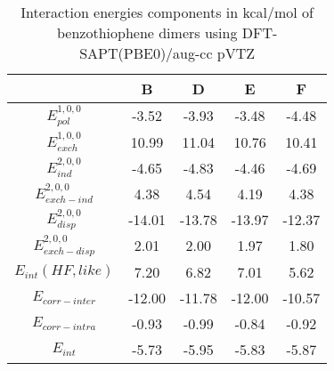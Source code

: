 		\begin{spacing}{1.3}
			\begin{table}[H]
				\caption{Interaction energies components in kcal/mol of benzothiophene dimers using DFT-SAPT(PBE0)/aug-cc pVTZ}
				\begin{center}
					\begin{tabular}{c c c c c}
						\toprule
						&\textbf{B} &\textbf{D} &\textbf{E} &\textbf{F} \\
						\midrule
						\multicolumn{1}{p{5cm}}{\centering \textbf{$E^{1,0,0}_{pol}$}}       & -3.52     & -3.93     & -3.48     & -4.48     \\
						\multicolumn{1}{p{5cm}}{\centering \textbf{$E^{1,0,0}_{exch}$}}      & 10.99     & 11.04     & 10.76     & 10.41     \\
						\multicolumn{1}{p{5cm}}{\centering \textbf{$E^{2,0,0}_{ind}$}}       & -4.65     & -4.83     &-4.46      & -4.69     \\
						\multicolumn{1}{p{5cm}}{\centering \textbf{$E^{2,0,0}_{exch-ind}$}}  & 4.38      & 4.54      & 4.19      & 4.38      \\
						\multicolumn{1}{p{5cm}}{\centering \textbf{$E^{2,0,0}_{disp}$}}      & -14.01    & -13.78    & -13.97    & -12.37    \\
						\multicolumn{1}{p{5cm}}{\centering \textbf{$E^{2,0,0}_{exch-disp}$}} & 2.01      & 2.00      & 1.97      & 1.80      \\
						\multicolumn{1}{p{5cm}}{\centering \textbf{$E_{int} (\scriptstyle HF, like)$}}    & 7.20      & 6.82      & 7.01      & 5.62      \\
						\multicolumn{1}{p{5cm}}{\centering \textbf{$E_{corr-inter}$}}        & -12.00    & -11.78    & -12.00    & -10.57    \\
						\multicolumn{1}{p{5cm}}{\centering \textbf{$E_{corr-intra}$}}        & -0.93     & -0.99     & -0.84     & -0.92     \\
						\multicolumn{1}{p{5cm}}{\centering \textbf{$E_{int}$}}               & -5.73     & -5.95     & -5.83     & -5.87     \\
						\bottomrule
					\end{tabular}
				\end{center}
			\end{table}
		\end{spacing}
		
